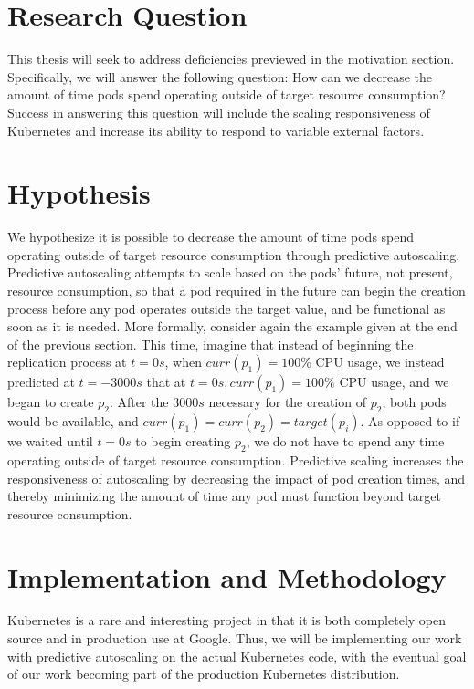 \documentclass[letterpaper,11pt,twocolumn]{article}
\begin{document}
\section{Research Question}

This thesis will seek to address deficiencies previewed in the
motivation section. Specifically, we will answer the following question:
How can we decrease the amount of time pods spend operating outside of target
resource consumption? Success in answering this question will include the
scaling responsiveness of Kubernetes and increase its ability to respond to
variable external factors.

\section{Hypothesis}

We hypothesize it is possible to decrease the amount of time pods spend
operating outside of target resource consumption through predictive autoscaling.
Predictive autoscaling attempts to scale based on the pods' future, not present, resource
consumption, so that a pod required in the future can begin
the creation process before any pod operates outside the target value,
and be functional as soon as it is needed.
More formally, consider again the example given at the end of the previous
section.
This time, imagine that instead of beginning the replication process at
$t = 0s$, when $curr(p_{1}) = 100\%$ CPU usage, we instead predicted at
$t = -3000s$ that at $t = 0s, curr(p_{1}) = 100\%$ CPU usage, and we began to
create $p_{2}$. After the $3000s$ necessary for the creation of $p_{2}$, both
pods would be available, and $curr(p_{1}) = curr(p_{2}) = target(p_{i})$. As
opposed to if we waited until $t = 0s$ to begin creating $p_{2}$, we do not have
to spend any time operating outside of target resource consumption. Predictive
scaling increases the responsiveness of autoscaling by decreasing the impact of
pod creation times, and thereby minimizing the amount of time any pod must
function beyond target resource consumption.

\section{Implementation and Methodology}

Kubernetes is a rare and interesting project in that it is both completely open
source and in production use at Google.\cite{google-container-engine}
Thus, we will be implementing our work
with predictive autoscaling on the actual Kubernetes code, with the eventual
goal of our work becoming part of the production Kubernetes distribution.
\end{document}
